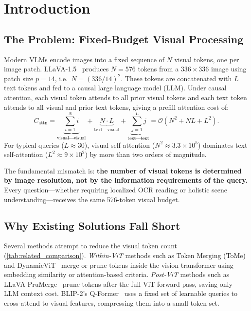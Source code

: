 \documentclass[11pt,a4paper]{article}
\begin{document}
\section{Introduction}
\label{sec:intro}

\subsection{The Problem: Fixed-Budget Visual Processing}

Modern VLMs encode images into a fixed sequence of $N$ visual tokens, one per
image patch. LLaVA-1.5~\citep{liu2024llava} produces $N{=}576$ tokens from a
$336{\times}336$ image using patch size $p{=}14$, i.e.\ $N{=}(336/14)^2$. These
tokens are concatenated with $L$ text tokens and fed to a causal large language
model (LLM). Under causal attention, each visual token attends to all prior
visual tokens and each text token attends to all visual and prior text tokens,
giving a prefill attention cost of:
\begin{equation}
  C_{\text{attn}}
  = \underbrace{\textstyle\sum_{i=1}^{N}i}_{\text{visual}\to\text{visual}}
  + \underbrace{N \cdot L}_{\text{text}\to\text{visual}}
  + \underbrace{\textstyle\sum_{j=1}^{L}j}_{\text{text}\to\text{text}}
  = \mathcal{O}(N^2 + NL + L^2).
  \label{eq:attn_cost}
\end{equation}
For typical queries ($L{\approx}30$), visual self-attention
($N^2{\approx}3.3{\times}10^5$) dominates text self-attention
($L^2{\approx}9{\times}10^2$) by more than two orders of magnitude.

The fundamental mismatch is: \textbf{the number of visual tokens is determined
by image resolution, not by the information requirements of the query.} Every
question---whether requiring localized OCR reading or holistic scene
understanding---receives the same 576-token visual budget.

\subsection{Why Existing Solutions Fall Short}

Several methods attempt to reduce the visual token count
(\cref{tab:related_comparison}). \emph{Within-ViT} methods such as Token
Merging (ToMe)~\citep{bolya2022token} and DynamicViT~\citep{rao2021dynamicvit}
merge or prune tokens inside the vision transformer using embedding similarity
or attention-based criteria. \emph{Post-ViT} methods such as
LLaVA-PruMerge~\citep{shang2024llava} prune tokens after the full ViT forward
pass, saving only LLM context cost. BLIP-2's
Q-Former~\citep{li2023blip2} uses a fixed set of learnable queries to
cross-attend to visual features, compressing them into a small token set.
\end{document}

